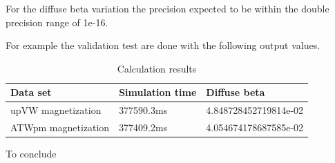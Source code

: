 For the diffuse beta variation the precision expected to be within the double precision range of 1e-16. 


For example the validation test are done with the following output values.

\begin{table}[h]
\centering
\begin{tabular}{| l | l | l |}
\hline
Data set & Simulation time & Diffuse beta  \\
\hline
upVW magnetization & 377590.3ms & 4.848728452719814e-02 \\
\hline
ATWpm magnetization & 377409.2ms & 4.054674178687585e-02 \\
\hline
\end{tabular}
\caption{Calculation results}
\label{tab:results}
\end{table}


\vspace{3.2em}

To conclude



